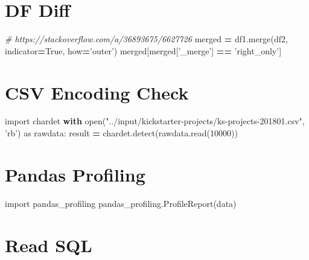 \documentclass[]{book}
\newenvironment{Shaded}{\begin{snugshade}}{\end{snugshade}}
\newcommand{\BuiltInTok}[1]{#1}
\newcommand{\CommentTok}[1]{\textcolor[rgb]{0.56,0.35,0.01}{\textit{#1}}}
\newcommand{\ControlFlowTok}[1]{\textcolor[rgb]{0.13,0.29,0.53}{\textbf{#1}}}
\newcommand{\DecValTok}[1]{\textcolor[rgb]{0.00,0.00,0.81}{#1}}
\newcommand{\ImportTok}[1]{#1}
\newcommand{\NormalTok}[1]{#1}
\newcommand{\OperatorTok}[1]{\textcolor[rgb]{0.81,0.36,0.00}{\textbf{#1}}}
\newcommand{\StringTok}[1]{\textcolor[rgb]{0.31,0.60,0.02}{#1}}
\newcommand{\VariableTok}[1]{\textcolor[rgb]{0.00,0.00,0.00}{#1}}
\begin{document}
\hypertarget{df-diff}{%
\section{DF Diff}\label{df-diff}}

\begin{Shaded}
\begin{Highlighting}[]
\CommentTok{# https://stackoverflow.com/a/36893675/6627726}
\NormalTok{merged }\OperatorTok{=}\NormalTok{ df1.merge(df2, indicator}\OperatorTok{=}\VariableTok{True}\NormalTok{, how}\OperatorTok{=}\StringTok{'outer'}\NormalTok{)}
\NormalTok{merged[merged[}\StringTok{'_merge'}\NormalTok{] }\OperatorTok{==} \StringTok{'right_only'}\NormalTok{]}
\end{Highlighting}
\end{Shaded}

\hypertarget{csv-encoding-check}{%
\section{CSV Encoding Check}\label{csv-encoding-check}}

\begin{Shaded}
\begin{Highlighting}[]
\ImportTok{import}\NormalTok{ chardet}
\ControlFlowTok{with} \BuiltInTok{open}\NormalTok{(}\StringTok{"../input/kickstarter-projects/ks-projects-201801.csv"}\NormalTok{, }\StringTok{'rb'}\NormalTok{) }\ImportTok{as}\NormalTok{ rawdata:}
\NormalTok{    result }\OperatorTok{=}\NormalTok{ chardet.detect(rawdata.read(}\DecValTok{10000}\NormalTok{))}
\end{Highlighting}
\end{Shaded}

\hypertarget{pandas-profiling}{%
\section{Pandas Profiling}\label{pandas-profiling}}

\begin{Shaded}
\begin{Highlighting}[]
\ImportTok{import}\NormalTok{ pandas_profiling}
\NormalTok{pandas_profiling.ProfileReport(data)}
\end{Highlighting}
\end{Shaded}

\hypertarget{read-sql}{%
\section{Read SQL}\label{read-sql}}
\end{document}
